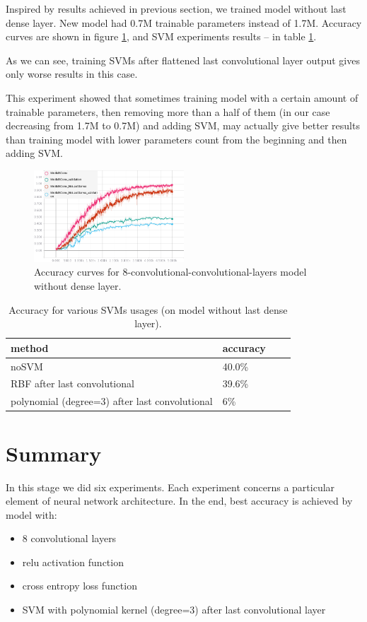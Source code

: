 \documentclass[a4paper]{article}
\begin{document}
Inspired by results achieved in previous section,
we trained model without last dense layer.
New model had 0.7M trainable parameters instead of 1.7M.
Accuracy curves are shown in figure \ref{fig:noDense},
and SVM experiments results -- in table \ref{table:svm2}.

As we can see, training SVMs after flattened last convolutional
layer output gives only worse results in this case.

This experiment showed that sometimes training model with a certain
amount of trainable parameters, then removing more than a half
of them (in our case decreasing from 1.7M to 0.7M) and adding SVM,
may actually give better results than training model with lower
parameters count from the beginning and then adding SVM.

\begin{figure}[!h]
    \centering
    \includegraphics[page=2,width=0.5\textwidth]{noDense.png}
    \caption[]{Accuracy curves for 8-convolutional-convolutional-layers model without dense layer.
    \label{fig:noDense}
    }
\end{figure}

\begin{table}[!hbt]
    \caption{Accuracy for various SVMs usages (on model without last dense layer).
    \label{table:svm2}
    }
\begin{center}
    \begin{tabular}{| l | l | l | l |}
    \hline
    method&accuracy \\
    \hline
        noSVM & 40.0\% \\
        RBF after last convolutional & 39.6\% \\
        polynomial (degree=3) after last convolutional & 6\% \\
    \hline
    \end{tabular}
\end{center}
\end{table}

\section{Summary}
In this stage we did six experiments. Each experiment concerns
a particular element of neural network architecture.
In the end, best accuracy is achieved by model with:
\begin{itemize}
    \item 8 convolutional layers
    \item relu activation function
    \item cross entropy loss function
    \item SVM with polynomial kernel (degree=3) after last convolutional layer
\end{itemize}
\end{document}
